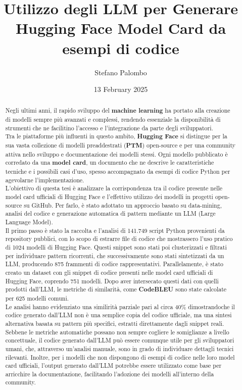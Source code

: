 \documentclass{article}
\title{Utilizzo degli LLM per Generare Hugging Face Model Card da esempi di codice}
\author{Stefano Palombo}
\date{13 February 2025}
\begin{document}
\maketitle

\begin{abstract}
Negli ultimi anni, il rapido sviluppo del \textbf{machine learning} ha portato alla creazione di modelli sempre più avanzati e complessi, rendendo essenziale la disponibilità di strumenti che ne facilitino l’accesso e l’integrazione da parte degli sviluppatori.\\ 
Tra le piattaforme più influenti in questo ambito, \textbf{Hugging Face} si distingue per la sua vasta collezione di modelli preaddestrati (\textbf{PTM}) open-source e per una community attiva nello sviluppo e documentazione dei modelli stessi. Ogni modello pubblicato è corredato da una \textbf{model card}, un documento che ne descrive le caratteristiche tecniche e i possibili casi d’uso, spesso accompagnato da esempi di codice Python per agevolarne l’implementazione.\\
L’obiettivo di questa tesi è analizzare la corrispondenza tra il codice presente nelle model card ufficiali di Hugging Face e l’effettivo utilizzo dei modelli in progetti open-source su GitHub. Per farlo, è stato adottato un approccio basato su data-mining, analisi del codice e generazione automatica di pattern mediante un LLM (Large Language Model).\\
Il primo passo è stato la raccolta e l’analisi di 141.749 script Python provenienti da repository pubblici, con lo scopo di estrarre file di codice che mostrassero l’uso pratico di 1024 modelli di Hugging Face. Questi snippet sono stati poi clusterizzati e filtrati per individuare pattern ricorrenti, che successivamente sono stati sintetizzati da un LLM, producendo 875 frammenti di codice rappresentativi. Parallelamente, è stato creato un dataset con gli snippet di codice presenti nelle model card ufficiali di Hugging Face, coprendo 751 modelli. Dopo aver intersecato questi dati con quelli prodotti dall’LLM, le metriche di similarità, come \textbf{CodeBLEU} sono state calcolate per 625 modelli comuni.\\
Le analisi hanno evidenziato una similirità parziale pari al circa 40\% dimostrandoche il codice generato dall’LLM non è una semplice copia del codice ufficiale, ma una sintesi alternativa basata su pattern più specifici, estratti direttamente dagli snippet reali.
Sebbene le metriche automatiche possano non sempre cogliere le somiglianze a livello concettuale, il codice generato dall’LLM può essere comunque utile per gli sviluppatori umani, che, attraverso un’analisi manuale, sono in grado di individuare dettagli tecnici rilevanti. Inoltre, per i modelli che non dispongono di esempi di codice nelle loro model card ufficiali, l’output generato dall’LLM potrebbe essere utilizzato come base per arricchire la documentazione, facilitando l’adozione dei modelli all’interno della community.\\

\end{abstract}
\end{document}
